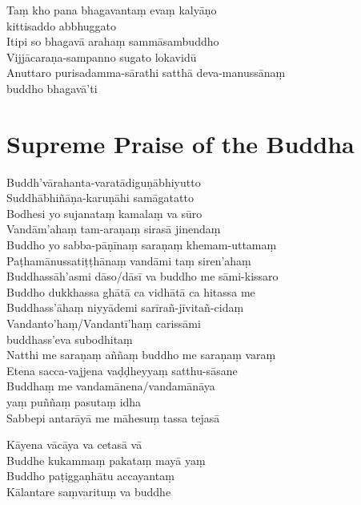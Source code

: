 \begin{leader}
\end{leader}

Taṃ kho pana bhagavantaṃ evaṃ kalyāṇo\\
\vin kittisaddo abbhuggato\\
Itipi so bhagavā arahaṃ sammāsambuddho\\
Vijjācaraṇa-sampanno sugato lokavidū\\
Anuttaro purisadamma-sārathi satthā deva-manussānaṃ\\
\vin buddho bhagavā'ti

\section*{Supreme Praise of the Buddha}

\begin{leader}
\end{leader}

Buddh'vārahanta-varatādiguṇābhiyutto\\
Suddhābhiñāṇa-karuṇāhi samāgatatto\\
Bodhesi yo sujanataṃ kamalaṃ va sūro\\
Vandām'ahaṃ tam-araṇaṃ sirasā jinendaṃ\\
Buddho yo sabba-pāṇīnaṃ saraṇaṃ khemam-uttamaṃ\\
Paṭhamānussatiṭṭhānaṃ vandāmi taṃ siren'ahaṃ\\
Buddhassāh'asmi dāso/dāsī va buddho me sāmi-kissaro\\
Buddho dukkhassa ghātā ca vidhātā ca hitassa me\\
Buddhass'āhaṃ niyyādemi sarīrañ-jīvitañ-cidaṃ\\
Vandanto'haṃ/Vandantī'haṃ carissāmi\\
\vin buddhass'eva subodhitaṃ\\
Natthi me saraṇaṃ aññaṃ buddho me saraṇaṃ varaṃ\\
Etena sacca-vajjena vaḍḍheyyaṃ satthu-sāsane\\
Buddhaṃ me vandamānena/vandamānāya\\
\vin yaṃ puññaṃ pasutaṃ idha\\
Sabbepi antarāyā me māhesuṃ tassa tejasā

\enlargethispage{\baselineskip}


Kāyena vācāya va cetasā vā\\
Buddhe kukammaṃ pakataṃ mayā yaṃ\\
Buddho paṭiggaṇhātu accayantaṃ\\
Kālantare saṃvarituṃ va buddhe

